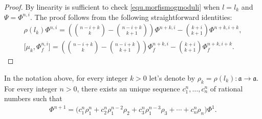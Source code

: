 \begin{proof} By linearity is suf\/f\/icient to check \eqref{equ.morfismogmoduli} when $l=l_k$ and $\Psi=\Phi^{n,i}$. The proof follows from the following straightforward identities:
\begin{gather*}%
\rho(l_k)\Phi^{n,i}=\left(\binom{n-i+k}{k}-\binom{n-i+k}{k+1}\right)\Phi^{n+k,i}-\binom{k+i}{k+1}\Phi^{n+k,i+k},\\
\big[\mu_k,\Phi^{n,i}_f\big]=\left(\binom{n-i+k}{k}-\binom{n-i+k}{k+1}\right)\Phi^{n+k,i}_f-\binom{k+i}{k+1}\Phi^{n+k,i+k}_f.\tag*{\qed}
\end{gather*}
\renewcommand{\qed}{}
\end{proof}

\begin{Theorem}\label{thm.basisforPhienne}
In the notation above, for every integer $k>0$ let's denote by $\rho_k=\rho(l_k)\colon \mathfrak{a}\to \mathfrak{a}$.
For every integer $n>0$, there exists an unique sequence $c^n_1,\ldots,c^n_n$ of rational numbers such that
\begin{gather*}\Phi^{n+1}=\big(c^n_1\rho_1^n+c^n_2\rho_1^{n-2}\rho_2+c^n_3\rho_1^{n-3}\rho_3+\cdots+c^n_n\rho_n\big)\Phi^1.\end{gather*}
\end{Theorem}


